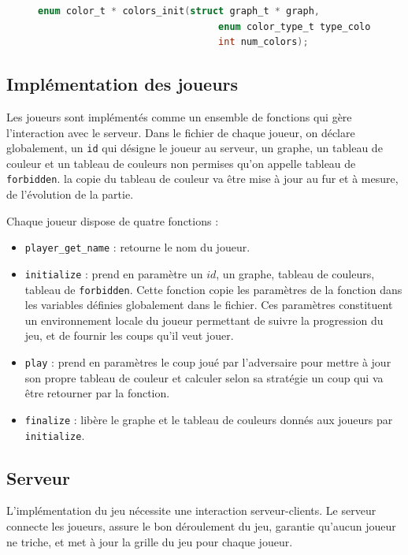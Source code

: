 \documentclass[11pt]{article}
\begin{document}
\begin{figure}[h!]
    \begin{lstlisting}[language=C]
        enum color_t * colors_init(struct graph_t * graph, 
                                enum color_type_t type_color, 
                                int num_colors);
    \end{lstlisting}
\end{figure}

\subsection{Implémentation des joueurs}
Les joueurs sont implémentés comme un ensemble de fonctions qui gère l'interaction avec le serveur. Dans le fichier de chaque joueur, on déclare globalement, un \texttt{id} qui désigne le joueur au serveur, un graphe, un tableau de couleur et un tableau de couleurs non permises qu'on appelle tableau de \texttt{forbidden}. la copie du tableau de couleur va être mise à jour au fur et à mesure, de l'évolution de la partie.
\par
Chaque joueur dispose de quatre fonctions :
\begin{itemize}
    \item \texttt{player\_get\_name} : retourne le nom du joueur.
    \item \texttt{initialize} : prend en paramètre un $id$, un graphe, tableau de couleurs, tableau de \texttt{forbidden}. Cette fonction copie les paramètres de la fonction dans les variables définies globalement dans le fichier. Ces paramètres constituent un environnement locale du joueur permettant de suivre la progression du jeu, et de fournir les coups qu'il veut jouer.
    \item \texttt{play} : prend en paramètres le coup joué par l'adversaire pour mettre à jour son propre tableau de couleur et calculer selon sa stratégie un coup qui va être retourner par la fonction.
    \item \texttt{finalize} : libère le graphe et le tableau de couleurs donnés aux joueurs par \texttt{initialize}.
\end{itemize}
\subsection{Serveur}
\par
L'implémentation du jeu nécessite une interaction serveur-clients. Le serveur connecte les joueurs, assure le bon déroulement du jeu, garantie qu'aucun joueur ne triche, et met à jour la grille du jeu pour chaque joueur.\\
\end{document}
